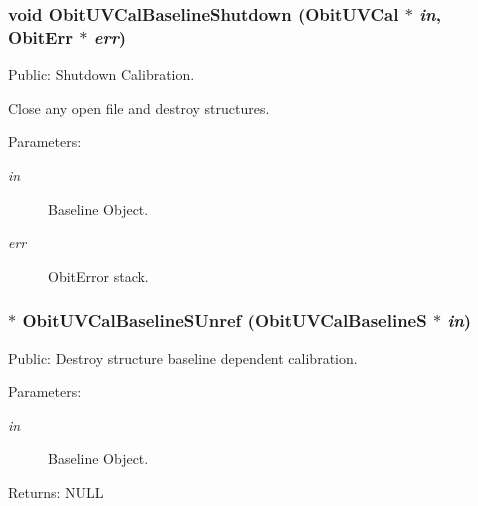 \subsubsection{\setlength{\rightskip}{0pt plus 5cm}void Obit\-UVCal\-Baseline\-Shutdown ({\bf Obit\-UVCal} $\ast$ {\em in}, {\bf Obit\-Err} $\ast$ {\em err})}\label{ObitUVCalBaseline_8c_a5}


Public: Shutdown Calibration. 

Close any open file and destroy structures. \begin{Desc}
\item[Parameters:]
\begin{description}
\item[{\em in}]Baseline Object. \item[{\em err}]Obit\-Error stack. \end{description}
\end{Desc}
\subsubsection{$\ast$ Obit\-UVCal\-Baseline\-SUnref ({\bf Obit\-UVCal\-Baseline\-S} $\ast$ {\em in})}\label{ObitUVCalBaseline_8c_a6}


Public: Destroy structure baseline dependent calibration. 

\begin{Desc}
\item[Parameters:]
\begin{description}
\item[{\em in}]Baseline Object. \end{description}
\end{Desc}
\begin{Desc}
\item[Returns:]NULL \end{Desc}
